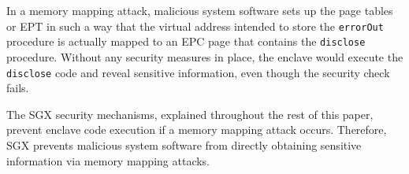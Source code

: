 In a memory mapping attack, malicious system software sets up the page tables
or EPT in such a way that the virtual address intended to store the
\texttt{errorOut} procedure is actually mapped to an EPC page that contains the
\texttt{disclose} procedure. Without any security measures in place, the
enclave would execute the \texttt{disclose} code and reveal sensitive
information, even though the security check fails.

The SGX security mechanisms, explained throughout the rest of this paper,
prevent enclave code execution if a memory mapping attack occurs. Therefore,
SGX prevents malicious system software from directly obtaining sensitive
information via memory mapping attacks.
